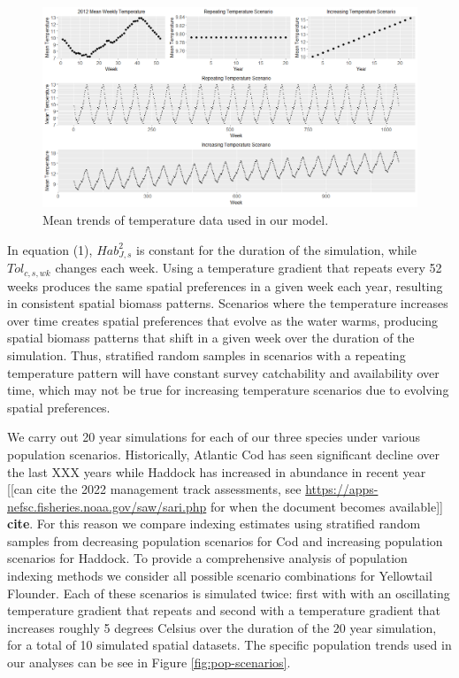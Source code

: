 \documentclass[
  12pt,
]{article}
\begin{document}
\begin{figure}

{\centering \includegraphics[width=0.95\linewidth]{Images/TempScenarios} 

}

\caption{Mean trends of temperature data used in our model.}\label{fig:temp-scenarios}
\end{figure}

In equation (1), \(Hab^2_{J,s}\) is constant for the duration of the simulation, while \(Tol_{c,s,wk}\) changes each week. Using a temperature gradient that repeats every 52 weeks produces the same spatial preferences in a given week each year, resulting in consistent spatial biomass patterns. Scenarios where the temperature increases over time creates spatial preferences that evolve as the water warms, producing spatial biomass patterns that shift in a given week over the duration of the simulation. Thus, stratified random samples in scenarios with a repeating temperature pattern will have constant survey catchability and availability over time, which may not be true for increasing temperature scenarios due to evolving spatial preferences.

We carry out 20 year simulations for each of our three species under various population scenarios. Historically, Atlantic Cod has seen significant decline over the last XXX years while Haddock has increased in abundance in recent year {[}{[}can cite the 2022 management track assessments, see \url{https://apps-nefsc.fisheries.noaa.gov/saw/sari.php} for when the document becomes available{]}{]} \textbf{cite}. For this reason we compare indexing estimates using stratified random samples from decreasing population scenarios for Cod and increasing population scenarios for Haddock. To provide a comprehensive analysis of population indexing methods we consider all possible scenario combinations for Yellowtail Flounder. Each of these scenarios is simulated twice: first with with an oscillating temperature gradient that repeats and second with a temperature gradient that increases roughly 5 degrees Celsius over the duration of the 20 year simulation, for a total of 10 simulated spatial datasets. The specific population trends used in our analyses can be see in Figure \ref{fig:pop-scenarios}.
\end{document}

